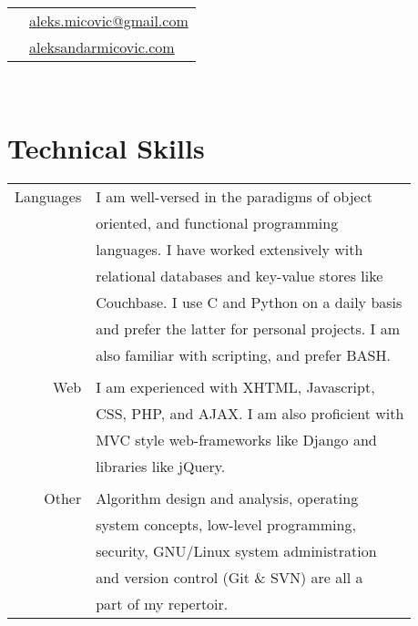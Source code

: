 \documentclass[10pt]{article}
\begin{document}
\hfill
\begin{minipage}[t]{0.44\textwidth}

    \vspace{0pt}
	
\colorbox{shade}{\textcolor{text1}{
    \begin{tabular}{c|p{7cm}}
        \raisebox{-3pt}{\Envelope}
        &\href{mailto:aleks.micovic@gmail.com}{aleks.micovic@gmail.com}\\
		\raisebox{-3pt}{\ArrowBoldDownRight}
		&\href{http://aleksandarmicovic.com}{aleksandarmicovic.com}
	\end{tabular}}}\\[10pt]

\section{Technical Skills}
    \begin{tabular}{rl}
    Languages &  I am well-versed in the paradigms of object\\
              &  oriented, and functional programming\\
              &  languages. I have worked extensively with\\
              &  relational databases and key-value stores like\\
              &  Couchbase. I use C and Python on a daily basis\\
              &  and prefer the latter for personal projects. I am\\ 
              &  also familiar with scripting, and prefer BASH.\\ 
              \\
 	  Web &  I am experienced with XHTML, Javascript,\\
              &  CSS, PHP, and AJAX. I am also proficient with\\ 
              &  MVC style web-frameworks like Django and\\
              &  libraries like jQuery.\\
              \\
        Other &  Algorithm design and analysis, operating\\
              &  system concepts, low-level programming, \\
              &  security, GNU/Linux system administration\\
              &  and version control (Git \& SVN) are all a\\ 
              &  part of my repertoir.\\
    \end{tabular}\\[10pt]


\end{minipage}
\end{document}
